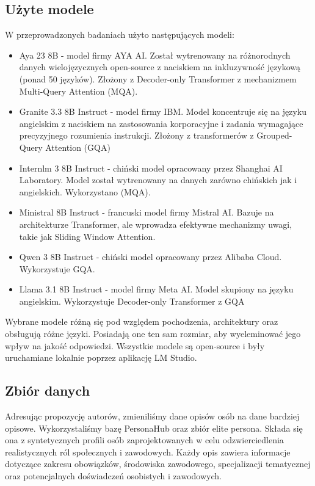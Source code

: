 \documentclass{article}
\begin{document}
\subsection{Użyte modele}
W przeprowadzonych badaniach użyto następujących modeli:
\begin{itemize}
    \item Aya 23 8B - model firmy AYA AI. Został wytrenowany na różnorodnych danych wielojęzycznych open-source z naciskiem na inkluzywność językową (ponad 50 języków). Złożony z Decoder-only Transformer z mechanizmem Multi-Query Attention (MQA).
    \item Granite 3.3 8B Instruct - model firmy IBM. Model koncentruje się na języku angielskim z naciskiem na zastosowania korporacyjne i zadania wymagające precyzyjnego rozumienia instrukcji. Złożony z transformerów z Grouped-Query Attention (GQA)
    \item Internlm 3 8B Instruct - chiński model opracowany przez Shanghai AI Laboratory. Model został wytrenowany na danych zarówno chińskich jak i angielskich. Wykorzystano (MQA).
    \item Ministral 8B Instruct - francuski model firmy Mistral AI. Bazuje na architekturze Transformer, ale wprowadza efektywne mechanizmy uwagi, takie jak Sliding Window Attention. 
    \item Qwen 3 8B Instruct - chiński model opracowany przez Alibaba Cloud. Wykorzystuje GQA.
    \item Llama 3.1 8B Instruct - model firmy Meta AI. Model skupiony na języku angielskim. Wykorzystuje Decoder-only Transformer z GQA \\
\end{itemize}
Wybrane modele różną się pod względem pochodzenia, architektury oraz obsługują różne języki.
Posiadają one ten sam rozmiar, aby wyeleminować jego wpływ na jakość odpowiedzi. Wszystkie modele są open-source i były uruchamiane lokalnie poprzez aplikację LM Studio.

\subsection{Zbiór danych}
Adresując propozycję autorów, zmieniliśmy dane opisów osób na dane bardziej opisowe. Wykorzystaliśmy bazę PersonaHub oraz zbiór elite persona. Składa się ona z syntetycznych profili osób zaprojektowanych w celu odzwierciedlenia realistycznych ról społecznych i zawodowych.
Każdy opis zawiera informacje dotyczące zakresu obowiązków, środowiska zawodowego, specjalizacji tematycznej oraz potencjalnych doświadczeń osobistych i zawodowych.
\end{document}
